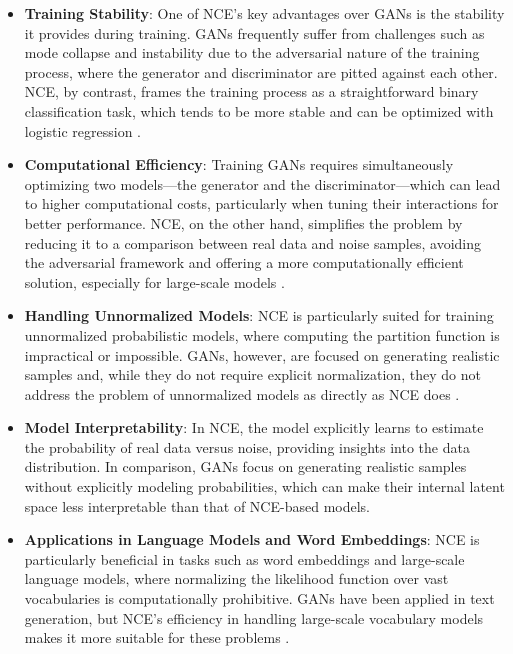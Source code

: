 \begin{itemize}
    \item \textbf{Training Stability}: One of NCE’s key advantages over GANs is the stability it provides during training. GANs frequently suffer from challenges such as mode collapse and instability due to the adversarial nature of the training process, where the generator and discriminator are pitted against each other. NCE, by contrast, frames the training process as a straightforward binary classification task, which tends to be more stable and can be optimized with logistic regression \citep{10.18653/v1/e17-2003}.
    
    \item \textbf{Computational Efficiency}: Training GANs requires simultaneously optimizing two models—the generator and the discriminator—which can lead to higher computational costs, particularly when tuning their interactions for better performance. NCE, on the other hand, simplifies the problem by reducing it to a comparison between real data and noise samples, avoiding the adversarial framework and offering a more computationally efficient solution, especially for large-scale models \citep{10.21437/interspeech.2016-1295}.
    
    \item \textbf{Handling Unnormalized Models}: NCE is particularly suited for training unnormalized probabilistic models, where computing the partition function is impractical or impossible. GANs, however, are focused on generating realistic samples and, while they do not require explicit normalization, they do not address the problem of unnormalized models as directly as NCE does \citep{10.48550/arxiv.2101.03288}.
    
    \item \textbf{Model Interpretability}: In NCE, the model explicitly learns to estimate the probability of real data versus noise, providing insights into the data distribution. In comparison, GANs focus on generating realistic samples without explicitly modeling probabilities, which can make their internal latent space less interpretable than that of NCE-based models.
    
    \item \textbf{Applications in Language Models and Word Embeddings}: NCE is particularly beneficial in tasks such as word embeddings and large-scale language models, where normalizing the likelihood function over vast vocabularies is computationally prohibitive. GANs have been applied in text generation, but NCE’s efficiency in handling large-scale vocabulary models makes it more suitable for these problems \citep{10.48550/arxiv.2101.03288}.
\end{itemize}

